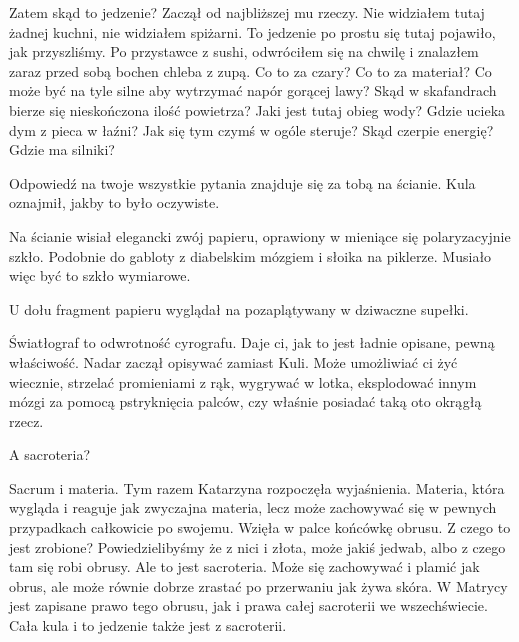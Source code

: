 \ds{} Zatem skąd to jedzenie? \dm{} Zaczął od najbliższej mu rzeczy. \dm{} Nie widziałem tutaj żadnej kuchni, nie widziałem spiżarni.
To jedzenie po prostu się tutaj pojawiło, jak przyszliśmy. Po przystawce z sushi, odwróciłem się na chwilę i znalazłem zaraz przed sobą bochen chleba z zupą.
Co to za czary? Co to za materiał? Co może być na tyle silne aby wytrzymać napór gorącej lawy? 
Skąd w skafandrach bierze się nieskończona ilość powietrza? Jaki jest tutaj obieg wody? 
Gdzie ucieka dym z pieca w łaźni? Jak się tym czymś w ogóle steruje? Skąd czerpie energię? Gdzie ma silniki? \de{}

\ds{} Odpowiedź na twoje wszystkie pytania znajduje się za tobą na ścianie. \dm{} Kula oznajmił, jakby to było oczywiste. \de{}

Na ścianie wisiał elegancki zwój papieru, oprawiony w mieniące się polaryzacyjnie szkło.
Podobnie do gabloty z diabelskim mózgiem i słoika na piklerze. Musiało więc być to szkło wymiarowe.


U dołu fragment papieru wyglądał na pozaplątywany w dziwaczne supełki.

\ds{} Światłograf to odwrotność cyrografu. Daje ci, jak to jest ładnie opisane, pewną właściwość. \ds{} Nadar zaczął opisywać zamiast Kuli. \dm{}
Może umożliwiać ci żyć wiecznie, strzelać promieniami z rąk, wygrywać w lotka, eksplodować innym mózgi za pomocą pstryknięcia palców, czy właśnie posiadać taką oto okrągłą rzecz. \de{}

\ds{} A sacroteria? \de{}

\ds{} Sacrum i materia. \dm{} Tym razem Katarzyna rozpoczęła wyjaśnienia. \dm{} Materia, która wygląda i reaguje jak zwyczajna materia, lecz może zachowywać się w pewnych przypadkach całkowicie po swojemu. \dm{} Wzięła w palce końcówkę obrusu. \dm{} Z czego to jest zrobione? 
Powiedzielibyśmy że z nici i złota, może jakiś jedwab, albo z czego tam się robi obrusy.
Ale to jest sacroteria. Może się zachowywać i plamić jak obrus, ale może równie dobrze zrastać po przerwaniu jak żywa skóra. 
W Matrycy jest zapisane prawo tego obrusu, jak i prawa całej sacroterii we wszechświecie. Cała kula i to jedzenie także jest z sacroterii. \de{}


